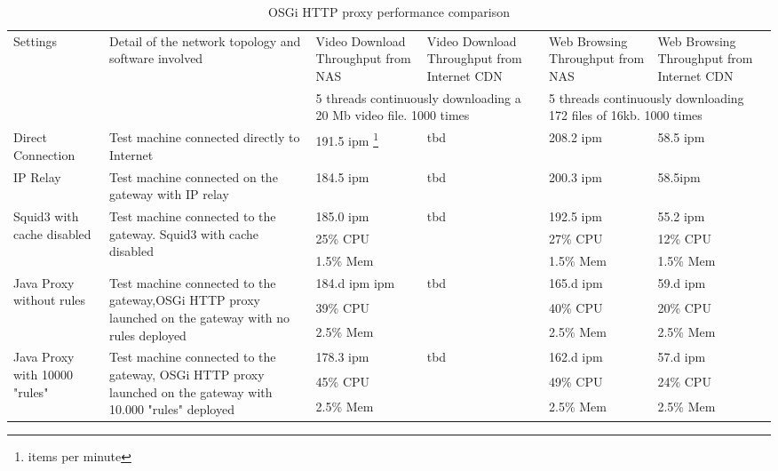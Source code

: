 \begin{table*}
	\centering
	\begin{tabular}{|p{}|p{}||p{}|p{}|p{}|p{}|}
		\hline
		\multirow{2}{0.10\textwidth}{Settings} & \multirow{2}{0.35\textwidth}{Detail of the network topology and software involved}   & Video Download Throughput from NAS & Video Download Throughput from Internet CDN      & Web Browsing Throughput from NAS & Web Browsing Throughput from Internet CDN \\ \cline{3-6}
		 & & \multicolumn{2}{m{0.20\textwidth}|}{5 threads continuously downloading a 20 Mb video file. 1000 times} & \multicolumn{2}{m{0.20\textwidth}|}{5 threads continuously downloading 172 files of 16kb. 1000 times}\\\hline\hline
		Direct Connection & Test machine connected directly to Internet & 191.5 ipm \footnote{items per minute} & tbd & 208.2 ipm & 58.5 ipm \\\hline
		IP Relay  & Test machine connected on the gateway with IP relay & 184.5 ipm & tbd & 200.3 ipm & 58.5ipm\\\hline
		\multirow{3}{0.10\textwidth}{Squid3 with cache disabled} & \multirow{3}{0.35\textwidth}{
		Test machine connected to the gateway. Squid3 with cache disabled} &185.0 ipm & \multirow{3}{*}{tbd} & 192.5 ipm & 55.2 ipm \\
		 & & 25\% CPU & & 27\% CPU & 12\% CPU \\
		 & & 1.5\% Mem & & 1.5\% Mem & 1.5\% Mem \\\hline
		
		\multirow{3}{0.10\textwidth}{Java Proxy without rules} & \multirow{3}{0.35\textwidth}{
		Test machine connected to the gateway,OSGi HTTP proxy launched on the gateway with no rules deployed} &184.d ipm ipm & \multirow{3}{*}{tbd} & 165.d ipm & 59.d ipm \\
		 & & 39\% CPU & & 40\% CPU & 20\% CPU \\
		 & & 2.5\% Mem & & 2.5\% Mem & 2.5\% Mem \\\hline
		 
		 \multirow{3}{0.10\textwidth}{Java Proxy with 10000 "rules"} & \multirow{3}{0.35\textwidth}{
		Test machine connected to the gateway, OSGi HTTP proxy launched on the gateway with 10.000 "rules" deployed} &178.3 ipm & \multirow{3}{*}{tbd} & 162.d ipm & 57.d ipm \\
		 & & 45\% CPU & & 49\% CPU & 24\% CPU \\
		 & & 2.5\% Mem & & 2.5\% Mem & 2.5\% Mem \\\hline
                                                
	\end{tabular}
	\caption{
	OSGi HTTP proxy performance comparison
	\label{tab:perf-comparison}
	}
	
\end{table*}


